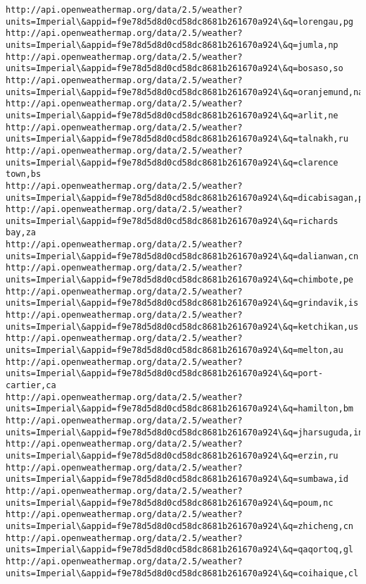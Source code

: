 \documentclass[11pt]{article}
\begin{document}
\begin{Verbatim}[commandchars=\\\{\}]
http://api.openweathermap.org/data/2.5/weather?units=Imperial\&appid=f9e78d5d8d0cd58dc8681b261670a924\&q=lorengau,pg
http://api.openweathermap.org/data/2.5/weather?units=Imperial\&appid=f9e78d5d8d0cd58dc8681b261670a924\&q=jumla,np
http://api.openweathermap.org/data/2.5/weather?units=Imperial\&appid=f9e78d5d8d0cd58dc8681b261670a924\&q=bosaso,so
http://api.openweathermap.org/data/2.5/weather?units=Imperial\&appid=f9e78d5d8d0cd58dc8681b261670a924\&q=oranjemund,na
http://api.openweathermap.org/data/2.5/weather?units=Imperial\&appid=f9e78d5d8d0cd58dc8681b261670a924\&q=arlit,ne
http://api.openweathermap.org/data/2.5/weather?units=Imperial\&appid=f9e78d5d8d0cd58dc8681b261670a924\&q=talnakh,ru
http://api.openweathermap.org/data/2.5/weather?units=Imperial\&appid=f9e78d5d8d0cd58dc8681b261670a924\&q=clarence town,bs
http://api.openweathermap.org/data/2.5/weather?units=Imperial\&appid=f9e78d5d8d0cd58dc8681b261670a924\&q=dicabisagan,ph
http://api.openweathermap.org/data/2.5/weather?units=Imperial\&appid=f9e78d5d8d0cd58dc8681b261670a924\&q=richards bay,za
http://api.openweathermap.org/data/2.5/weather?units=Imperial\&appid=f9e78d5d8d0cd58dc8681b261670a924\&q=dalianwan,cn
http://api.openweathermap.org/data/2.5/weather?units=Imperial\&appid=f9e78d5d8d0cd58dc8681b261670a924\&q=chimbote,pe
http://api.openweathermap.org/data/2.5/weather?units=Imperial\&appid=f9e78d5d8d0cd58dc8681b261670a924\&q=grindavik,is
http://api.openweathermap.org/data/2.5/weather?units=Imperial\&appid=f9e78d5d8d0cd58dc8681b261670a924\&q=ketchikan,us
http://api.openweathermap.org/data/2.5/weather?units=Imperial\&appid=f9e78d5d8d0cd58dc8681b261670a924\&q=melton,au
http://api.openweathermap.org/data/2.5/weather?units=Imperial\&appid=f9e78d5d8d0cd58dc8681b261670a924\&q=port-cartier,ca
http://api.openweathermap.org/data/2.5/weather?units=Imperial\&appid=f9e78d5d8d0cd58dc8681b261670a924\&q=hamilton,bm
http://api.openweathermap.org/data/2.5/weather?units=Imperial\&appid=f9e78d5d8d0cd58dc8681b261670a924\&q=jharsuguda,in
http://api.openweathermap.org/data/2.5/weather?units=Imperial\&appid=f9e78d5d8d0cd58dc8681b261670a924\&q=erzin,ru
http://api.openweathermap.org/data/2.5/weather?units=Imperial\&appid=f9e78d5d8d0cd58dc8681b261670a924\&q=sumbawa,id
http://api.openweathermap.org/data/2.5/weather?units=Imperial\&appid=f9e78d5d8d0cd58dc8681b261670a924\&q=poum,nc
http://api.openweathermap.org/data/2.5/weather?units=Imperial\&appid=f9e78d5d8d0cd58dc8681b261670a924\&q=zhicheng,cn
http://api.openweathermap.org/data/2.5/weather?units=Imperial\&appid=f9e78d5d8d0cd58dc8681b261670a924\&q=qaqortoq,gl
http://api.openweathermap.org/data/2.5/weather?units=Imperial\&appid=f9e78d5d8d0cd58dc8681b261670a924\&q=coihaique,cl

\end{Verbatim}
\end{document}
